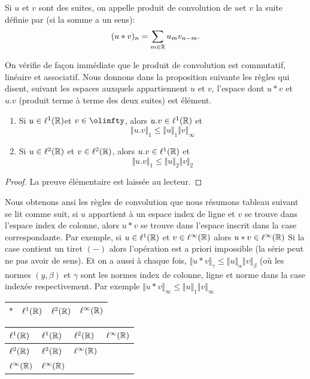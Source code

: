 \begin{definition}
Si $u$ et $v$ sont des suites, on appelle produit de convolution de $u$et $v$ la suite d\'{e}finie par (si la somme a un sens):
$$
(u*v)_{n}=\sum_{m\in \mathbb{R}}u_{m}v_{n-m}.
$$
\end{definition}
On v\'erifie de fa\c{c}on imm\'ediate que le produit de convolution est commutatif, lin\'{e}aire et associatif.
Nous donnons dans la proposition suivante les r\`{e}gles qui disent, suivant les espaces auxquels appartiennent $u$ et $v$, l'espace dont  $u*v$ et $u.v$ (produit terme \`{a} terme des deux suites) est \'el\'ement.

\begin{lemma}
\begin{enumerate}
\item Si $u\in \ell^1(\mathbb{R})$et $v\in \olinfty$, alors $u.v\in \ell^1(\mathbb{R})$ et
$$
\Vert u.v\Vert_{1}\leq\Vert u\Vert_{1}\Vert v\Vert_{\infty}
$$
\item Si $u\in \ell^2(\mathbb{R})$ et $v\in \ell^2(\mathbb{R})$, alors $u.v\in \ell^1(\mathbb{R})$ et
$$
\Vert u.v\Vert_{1}\leq\Vert u\Vert_{2}\Vert v\Vert_{2}
$$
\end{enumerate}
\end{lemma}
\begin{proof}
La preuve \'el\'ementaire est laiss\'ee au lecteur.
\end{proof}
Nous obtenons ansi les r\`{e}gles de convolution que nous r\'esumons tableau suivant se lit comme suit, si $u$ appartient \`{a} un espace index de ligne et $v$ se trouve dans l'espace index de colonne, alors $u*v$ se trouve dans l'espace inscrit dans la case correspondante. Par exemple, si $u\in \ell^1(\mathbb{R})$ et $v\in \ell^\infty(\mathbb{R})$ alors $u*v\in \ell^\infty(\mathbb{R})$ Si la case contient un tiret $(-)$ alors l'op\'{e}ration est a priori impossible (la s\'erie  peut ne pas avoir de sens). Et on a aussi \`{a} chaque fois, $\Vert u*v\Vert_{\gamma}\leq\Vert u\Vert_{\alpha}\Vert v\Vert_{\beta}$ (o\`{u} les normes $(y, \beta)$ et $\gamma$ sont les normes index de colonne, ligne et norme dans la case index\'{e}e respectivement. Par exemple $\Vert u*v\Vert_{\infty}\leq\Vert u\Vert_{1}\Vert v\Vert_{\infty}$
\begin{center}
\begin{tabular}{|l|l|l|l|}
\hline
\multicolumn{1}{|l|}{$*$}&	\multicolumn{1}{|l|}{ $\ell^1(\mathbb{R})$}&	\multicolumn{1}{|l|}{ $\ell^2(\mathbb{R})$}&	\multicolumn{1}{|l|}{ $\ell^\infty(\mathbb{R})$}	\\
\hline
\end{tabular}


\begin{tabular}{|l|l|l|l|}
\hline
\multicolumn{1}{|l|}{$\ell^1(\mathbb{R})$}&	\multicolumn{1}{|l|}{ $\ell^1(\mathbb{R})$}&	\multicolumn{1}{|l|}{ $\ell^2(\mathbb{R})$}&	\multicolumn{1}{|l|}{ $\ell^\infty(\mathbb{R})$}	\\
\hline
\multicolumn{1}{|l|}{ $\ell^2(\mathbb{R})$}&	\multicolumn{1}{|l|}{ $\ell^2(\mathbb{R})$}&	\multicolumn{1}{|l|}{ $\ell^\infty(\mathbb{R})$}&	\multicolumn{1}{|l|}{}	\\
\hline
\multicolumn{1}{|l|}{ $\ell^\infty(\mathbb{R})$}&	\multicolumn{1}{|l|}{ $\ell^\infty(\mathbb{R})$}&	\multicolumn{1}{|l|}{}&	\multicolumn{1}{|l|}{}	\\
\hline
\end{tabular}

\end{center}

